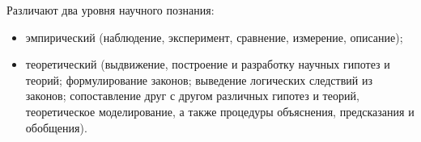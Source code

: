 
Различают два уровня научного познания:
\begin{itemize}
	\item эмпирический (наблюдение, эксперимент, сравнение, измерение, описание);
	\item теоретический (выдвижение, построение и разработку научных гипотез и теорий; формулирование законов; выведение логических следствий из законов; сопоставление друг с другом различных гипотез и теорий, теоретическое моделирование, а также процедуры объяснения, предсказания и обобщения).
\end{itemize}